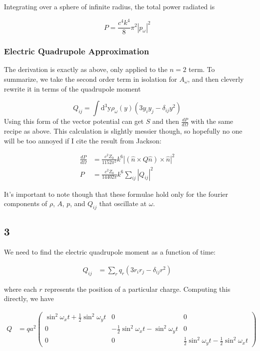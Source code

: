 \documentclass[12pt]{article}
\begin{document}
Integrating over a sphere of infinite radius, the total power radiated is

\[ P =  \frac{c^4 k^4}{8}\pi^2|p_\omega|^2
\]

\subsubsection*{Electric Quadrupole Approximation}

The derivation is exactly as above, only applied to the \(n=2\) term. To summarize, we take the second order term in isolation for \(A_\omega\), and then cleverly rewrite it in terms of the quadrupole moment

\[ Q_{ij} = \int \mathrm{d^3y}\rho_\omega(y)(3y_iy_j - \delta_{ij}y^2)
\]
Using this form of the vector potential can get \(S\) and then \(\frac{dP}{d\Omega}\) with the same recipe as above. This calculation is slightly messier though, so hopefully no one will be too annoyed if I cite the result from Jackson:

\begin{align*}
\frac{dP}{d\Omega} &= \frac{c^2Z_0}{1152\pi^2}k^6| (\hat{n} \times Q\hat{n}) \times \hat{n}|^2 \\[6pt]
P &= \frac{c^2Z_0}{14402\pi}k^6 \sum\limits_{ij}|Q_{ij}|^2
\end{align*}


It's important to note though that these formulae hold only for the fourier components of \(\rho\), \(A\), \(p\), and \(Q_{ij}\) that oscillate at \(\omega\).
\subsection*{3}

We need to find the electric quadrupole moment as a function of time:

\begin{align*}
Q_{ij} &= \sum_r q_r(3r_ir_j - \delta_{ij}r^2)
\end{align*}

where each \(r\) represents the position of a particular charge. Computing this directly, we have

\begin{align*}
Q &= qa^2\left( \begin{array}{ccc}
\sin^2\omega_xt+\frac{1}{2}\sin^2\omega_yt & 0 & 0 \\
0 & -\frac{1}{2}\sin^2\omega_xt-\sin^2\omega_yt & 0\\
0 &0 & \frac{1}{2}\sin^2\omega_yt - \frac{1}{2}\sin^2\omega_xt
\end{array}\right) 
\end{align*}
\end{document}
